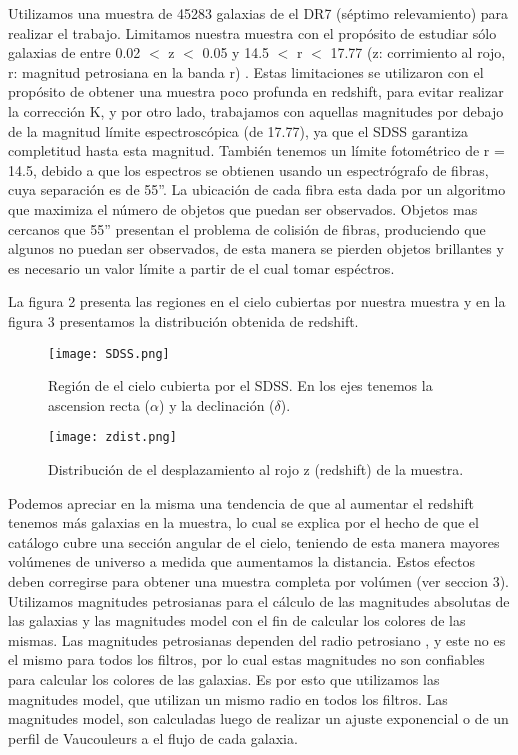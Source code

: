 \documentclass[a4paper,10pt]{article}
\begin{document}
Utilizamos una muestra de 45283 galaxias de el DR7 (s\'eptimo relevamiento) \citep{SDSS7} para realizar el trabajo. Limitamos nuestra muestra con el prop\'osito de estudiar s\'olo galaxias de entre 0.02 $<$ z $<$ 0.05 y 14.5 $<$ r $<$ 17.77 (z: corrimiento al rojo, r: magnitud petrosiana en la banda r) \citep{Petrosian}. Estas limitaciones se utilizaron con el prop\'osito de obtener una muestra poco profunda en redshift, para evitar realizar la correcci\'on K, y por otro lado, trabajamos con aquellas magnitudes por debajo de la magnitud l\'imite espectrosc\'opica (de 17.77), ya que el SDSS garantiza completitud hasta esta magnitud. Tambi\'en tenemos un l\'imite fotom\'etrico de r = 14.5, debido a que los espectros se obtienen usando un espectr\'ografo de fibras, cuya separaci\'on es de 55''. La ubicaci\'on de cada fibra esta dada por un algoritmo que maximiza el n\'umero de objetos que puedan ser observados. Objetos mas cercanos que 55'' presentan el problema de colisi\'on de fibras, produciendo que algunos no puedan ser observados, de esta manera se pierden objetos brillantes y es necesario un valor l\'imite a partir de el cual tomar esp\'ectros.


La figura 2 presenta las regiones en el cielo cubiertas por nuestra muestra y en la figura 3 presentamos la distribuci\'on obtenida de redshift. 
\begin{figure}[h]
 \centering
 \texttt{[image: SDSS.png]}
 \caption{Regi\'on de el cielo cubierta por el SDSS. En los ejes tenemos la ascension recta ($\alpha$) y la declinaci\'on ($\delta$).}
 \label{fig: 2}
\end{figure}
\begin{figure}[h]
 \centering
 \texttt{[image: zdist.png]}
 \caption{Distribuci\'on de el desplazamiento al rojo z (redshift) de la muestra.}
 \label{fig: 3}
\end{figure}


Podemos apreciar en la misma una tendencia de que al aumentar el redshift tenemos m\'as galaxias en la muestra, lo cual se explica por el hecho de que el cat\'alogo cubre una secci\'on angular de el cielo, teniendo de esta manera mayores vol\'umenes de universo a medida que aumentamos la distancia. Estos efectos deben corregirse para obtener una muestra completa por vol\'umen (ver seccion 3).
Utilizamos magnitudes petrosianas para el c\'alculo de las magnitudes absolutas de las galaxias y las magnitudes model con el fin de calcular los colores de las mismas. Las magnitudes petrosianas dependen del radio petrosiano \citep{Petrosian} , y este no es el mismo para todos los filtros, por lo cual estas magnitudes no son confiables para calcular los colores de las galaxias. Es por esto que utilizamos las magnitudes model, que utilizan un mismo radio en todos los filtros. 
Las magnitudes model, son calculadas luego de realizar un ajuste exponencial o de un perfil de Vaucouleurs a el flujo de cada galaxia. 
\end{document}

